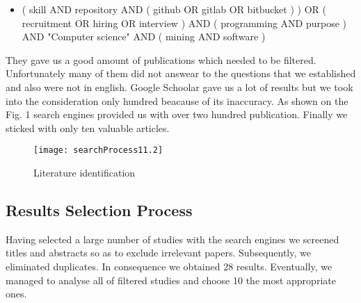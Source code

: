 \documentclass[graybox]{svmult}
\begin{document}
\begin{itemize}
    \item ( skill  AND  repository  AND  ( github  OR  gitlab  OR  bitbucket ) )  OR  ( recruitment  OR  hiring  OR  interview )  AND  ( programming  AND  purpose )  AND  "Computer science"  AND  ( mining  AND  software )
\end{itemize}
They gave us a good amount of publications which needed to be filtered. Unfortunately many of them did not answear to the questions that we established and also were not in english. Google Schoolar gave us a lot of results but we took into the consideration only hundred beacause of its inaccuracy. As shown on the Fig. 1 search engines provided us with over two hundred publication. Finally we sticked with only ten valuable articles.

\begin{figure}[htp]
    \centering
    \texttt{[image: searchProcess11.2]}
    \caption{Literature identification }
\end{figure}

\subsection{Results Selection Process}
Having selected a large number of studies with the search engines we screened titles and abstracts so as to exclude irrelevant papers. Subsequently, we eliminated duplicates. In consequence we obtained 28 results. Eventually, we managed to analyse all of filtered studies and choose 10 the most appropriate ones.
\end{document}
